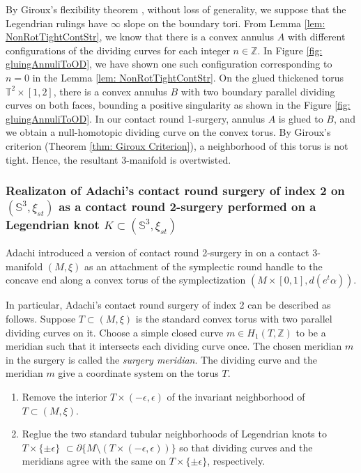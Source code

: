 \documentclass{amsart}
\theoremstyle{plain}
\theoremstyle{remark}
\theoremstyle{definition}
\newcommand{\s}{\mathbb{S}}
\newcommand{\dd}{\partial}
\begin{document}
By Giroux's flexibility theorem \cite{Giroux-Convex91}, without loss of generality, we suppose that the Legendrian rulings have $\infty$ slope on the boundary tori. From Lemma \ref{lem: NonRotTightContStr}, we know that there is a convex annulus $A$ with different configurations of the dividing curves for each integer $n\in \mathbb{Z}$. 
In Figure \ref{fig: gluingAnnuliToOD}, we have shown one such configuration corresponding to $n=0$ in the Lemma \ref{lem: NonRotTightContStr}. 
On the glued thickened torus $\mathbb{T}^2 \times [1,2]$, there is a convex annulus $B$ with two boundary parallel dividing curves on both faces, bounding a positive singularity as shown in the Figure \ref{fig: gluingAnnuliToOD}. 
In our contact round 1-surgery, annulus $A$ is glued to $B$, and we obtain a null-homotopic dividing curve on the convex torus. By Giroux's criterion (Theorem \ref{thm: Giroux Criterion}), a neighborhood of this torus is not tight. Hence, the resultant 3-manifold is overtwisted.

\subsubsection{Realizaton of Adachi's contact round surgery of index 2 on $\left(\s^3, \xi_{st}\right)$ as a contact round 2-surgery performed on a Legendrian knot $K\subset \left(\s^3, \xi_{st}\right)$} 
Adachi introduced a version of contact round 2-surgery in \cite{Jiro19}  on a contact 3-manifold $(M, \xi)$ as an attachment of the symplectic round handle to the concave end along a convex torus of the symplectization $(M\times [0,1], d(e^t\alpha))$.

In particular, Adachi's contact round surgery of index 2 can be described as follows. 
Suppose $T\subset (M, \xi)$ is the standard convex torus with two parallel dividing curves on it. 
Choose a simple closed curve $m \in H_1(T, \mathbb{Z})$ to be a meridian such that it intersects each dividing curve once. 
The chosen meridian $m$ in the surgery is called the {\it surgery meridian}. 
The dividing curve and the meridian $m$ give a coordinate system on the torus $T$. 

\begin{enumerate}
    \item Remove the interior $T\times (-\epsilon, \epsilon)$ of the invariant neighborhood of $T\subset(M, \xi)$. 
    \item Reglue the two standard tubular neighborhoods of Legendrian knots to $T\times \{\pm\epsilon\}$ $\subset \dd \{M\setminus (T\times (-\epsilon, \epsilon))\}$ so that dividing curves and the meridians agree with the same on $T\times \{\pm\epsilon\}$, respectively. 
\end{enumerate}
\end{document}
